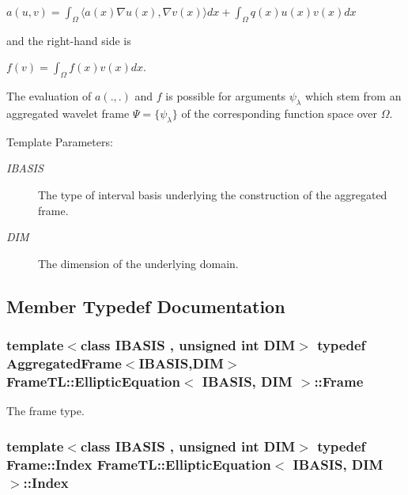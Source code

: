 $a(u,v) = \int_\Omega \langle a(x) \nabla u(x), \nabla v(x)\rangle dx + \int_\Omega q(x) u(x) v(x) dx$

and the right-hand side is

$f(v) = \int_\Omega f(x) v(x) dx$.

The evaluation of $a(.,.)$ and $f$ is possible for arguments $\psi_\lambda$ which stem from an aggregated wavelet frame $\Psi=\{\psi_\lambda\}$ of the corresponding function space over $\Omega$.

\begin{Desc}
\item[Template Parameters:]
\begin{description}
\item[{\em IBASIS}]The type of interval basis underlying the construction of the aggregated frame. \item[{\em DIM}]The dimension of the underlying domain. \end{description}
\end{Desc}


\subsection{Member Typedef Documentation}
\hypertarget{classFrameTL_1_1EllipticEquation_65fa5216492c8a03f841cf910182a00c}{
\subsubsection[{Frame}]{\setlength{\rightskip}{0pt plus 5cm}template$<$class IBASIS , unsigned int DIM$>$ {\bf typedef} {\bf AggregatedFrame}$<$IBASIS,DIM$>$ {\bf FrameTL::EllipticEquation}$<$ IBASIS, DIM $>$::{\bf Frame}}}
\label{classFrameTL_1_1EllipticEquation_65fa5216492c8a03f841cf910182a00c}


The frame type. \hypertarget{classFrameTL_1_1EllipticEquation_598c5b4d850e49947abc0a253298e94c}{
\subsubsection[{Index}]{\setlength{\rightskip}{0pt plus 5cm}template$<$class IBASIS , unsigned int DIM$>$ {\bf typedef} {\bf Frame::Index} {\bf FrameTL::EllipticEquation}$<$ IBASIS, DIM $>$::{\bf Index}}}
\label{classFrameTL_1_1EllipticEquation_598c5b4d850e49947abc0a253298e94c}


